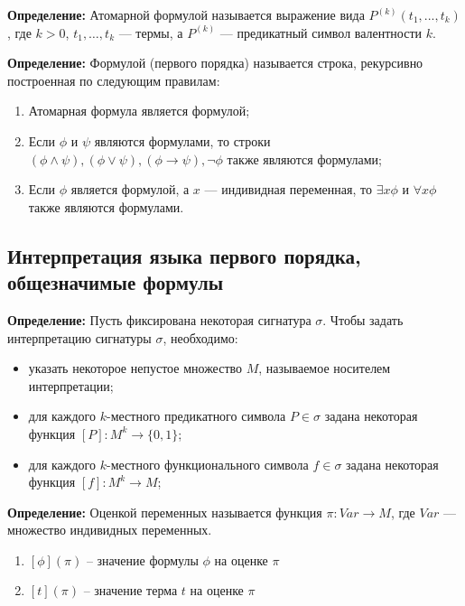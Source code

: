 \textbf{Определение:} Атомарной формулой называется выражение вида $P^{(k)}(t_1,...,t_k)$ , где $k>0$, $t_1,\ldots,t_k$ — термы, а $P^{(k)}$ — предикатный символ валентности $k$.

\textbf{Определение:} Формулой (первого порядка) называется строка, рекурсивно построенная по следующим правилам:
\begin{enumerate}
    \item Атомарная формула является формулой;
    \item Если $\phi$ и $\psi$ являются формулами, то строки $(\phi \land \psi), (\phi \lor \psi), (\phi \to \psi), \neg\phi$ также являются формулами;
    \item Если $\phi$ является формулой, а $x$ — индивидная переменная, то $\exists x \phi$ и $\forall x \phi$ также являются формулами.
\end{enumerate}


\subsection{Интерпретация языка первого порядка, общезначимые формулы}
\textbf{Определение:} Пусть фиксирована некоторая сигнатура $\sigma$. Чтобы задать интерпретацию сигнатуры $\sigma$, необходимо:
\begin{itemize}
    \item указать некоторое непустое множество $M$, называемое носителем интерпретации;
    \item для каждого $k$-местного предикатного символа $P\in \sigma$ задана некоторая функция $[P]:M^k\to \{0,1\}$;
    \item для каждого $k$-местного функционального символа $f\in \sigma$ задана некоторая функция $[f]:M^k\to M$;
\end{itemize}

\textbf{Определение:} Оценкой переменных называется функция $\pi : Var \to M$, где $Var$ — множество индивидных переменных.
\begin{enumerate}
    \item $[\phi](\pi)$ -- значение формулы $\phi$ на оценке $\pi$
    \item $[t](\pi)$ -- значение терма $t$ на оценке $\pi$
\end{enumerate}

